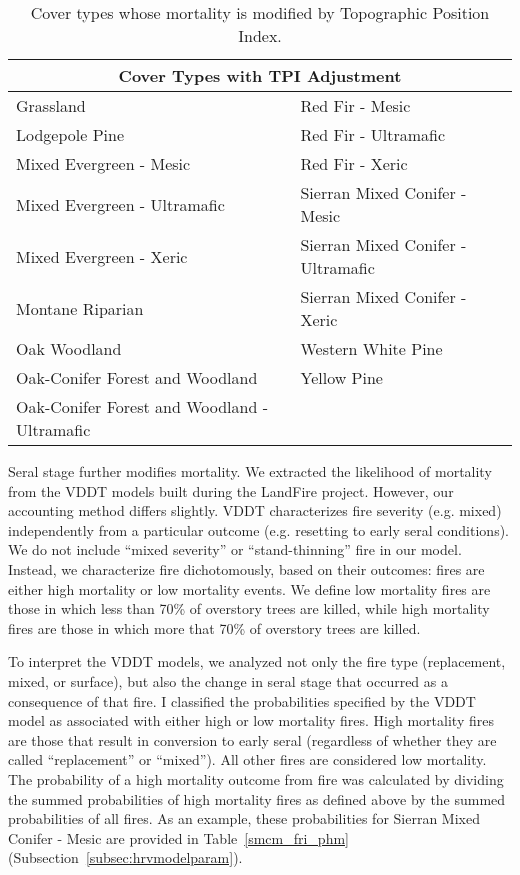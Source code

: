 \begin{itemize}
\begin{table}[htbp]
\small
\centering
\caption{Cover types whose mortality is modified by Topographic Position Index.}
\label{covtpi_mort}
\begin{tabular}{ll}
\hline
\multicolumn{2}{c}{\textbf{Cover Types with TPI Adjustment}} \\
\hline
Grassland     									& Red Fir - Mesic   					\\
Lodgepole Pine    								& Red Fir - Ultramafic					\\
Mixed Evergreen - Mesic							& Red Fir - Xeric    					\\
Mixed Evergreen - Ultramafic     				& Sierran Mixed Conifer - Mesic    		\\
Mixed Evergreen - Xeric 						& Sierran Mixed Conifer - Ultramafic 	\\
Montane Riparian								& Sierran Mixed Conifer - Xeric 		\\
Oak Woodland 									& Western White Pine					\\
Oak-Conifer Forest and Woodland 				& Yellow Pine 							\\
Oak-Conifer Forest and Woodland - Ultramafic 	&										\\
\hline
\end{tabular}
\end{table}

Seral stage further modifies mortality. We extracted the likelihood of mortality from the VDDT models built during the LandFire project. However, our accounting method differs slightly. VDDT characterizes fire severity (e.g. mixed) independently from a particular outcome (e.g. resetting to early seral conditions). We do not include ``mixed severity'' or ``stand-thinning'' fire \citep{Keeley2000} in our model. Instead, we characterize fire dichotomously, based on their outcomes: fires are either high mortality or low mortality events. We define low mortality fires are those in which less than 70\% of overstory trees are killed, while high mortality fires are those in which more that 70\% of overstory trees are killed. 

To interpret the VDDT models, we analyzed not only the fire type (replacement, mixed, or surface), but also the change in seral stage that occurred as a consequence of that fire. I classified the probabilities specified by the VDDT model as associated with either high or low mortality fires. High mortality fires are those that result in conversion to early seral (regardless of whether they are called ``replacement'' or ``mixed''). All other fires are considered low mortality. The probability of a high mortality outcome from fire was calculated by dividing the summed probabilities of high mortality fires as defined above by the summed probabilities of all fires. As an example, these probabilities for Sierran Mixed Conifer - Mesic are provided in Table~\ref{smcm_fri_phm} (Subsection~\ref{subsec:hrvmodelparam}).

\end{itemize}

